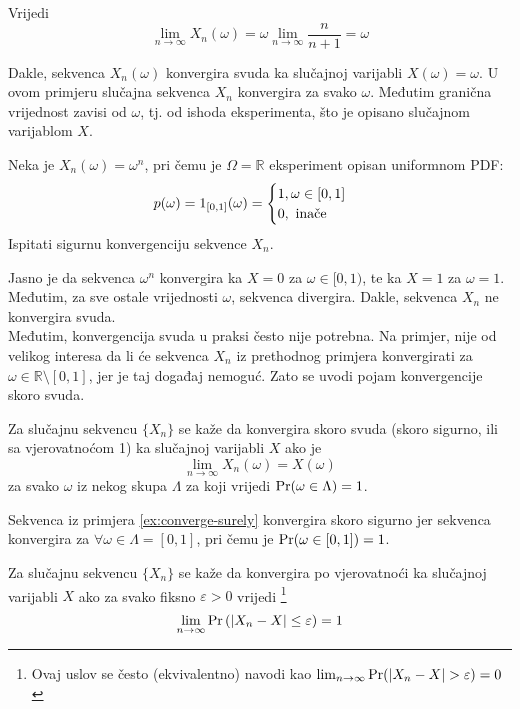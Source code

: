 Vrijedi
\begin{equation}
  \lim_{n\to\infty} X_n(\omega) = \omega \lim_{n\to\infty}\frac{n}{n+1} = \omega
\end{equation}

Dakle, sekvenca $X_n(\omega)$ konvergira svuda ka slučajnoj varijabli $X(\omega)
= \omega$. U ovom primjeru slučajna sekvenca $X_n$ konvergira za svako $\omega$.
Međutim granična vrijednost zavisi od $\omega$, tj. od ishoda eksperimenta, što
je opisano slučajnom varijablom $X$.

\begin{exmp} \label{ex:converge-surely}
  Neka je $X_n(\omega) = \omega^n$, pri čemu je $\Omega= \mathbb{R}$ eksperiment
  opisan uniformnom PDF:
  $$p(\omega) = 1_{[0,1]}(\omega) = \begin{cases}
      1, \omega \in [0,1]\ \\ 0,\ \text{\normalfont inače}
    \end{cases}
  $$
  Ispitati sigurnu konvergenciju sekvence $X_n$.
\end{exmp}

Jasno je da sekvenca $\omega^n$ konvergira ka $X=0$ za $\omega \in [0,1)$, te ka
$X=1$ za $\omega = 1$. Međutim, za sve ostale vrijednosti $\omega$, sekvenca
divergira. Dakle, sekvenca $X_n$ ne konvergira svuda.\\

Međutim, konvergencija svuda u praksi često nije potrebna. Na primjer, nije od
velikog interesa da li će sekvenca $X_n$ iz prethodnog primjera konvergirati za
$\omega \in \mathbb{R}\setminus[0,1]$, jer je taj događaj nemoguć. Zato se uvodi
pojam konvergencije skoro svuda.

\begin{definition}
  Za slučajnu sekvencu $\{X_n\}$ se kaže da konvergira skoro svuda (skoro
  sigurno, ili sa vjerovatnoćom 1) ka slučajnoj varijabli $X$ ako je
  \begin{equation}
    \lim_{n\to\infty} X_n(\omega) = X(\omega)
  \end{equation}
  za svako $\omega$ iz nekog skupa $\Lambda$ za koji vrijedi
  $\mathrm{Pr}(\omega\in\Lambda)=1$.
\end{definition}

Sekvenca iz primjera \ref{ex:converge-surely} konvergira skoro sigurno jer
sekvenca konvergira za $\forall \omega \in \Lambda = [0,1]$, pri čemu je
$\mathrm{Pr}(\omega \in [0,1]) = 1$.

\begin{definition}
  Za slučajnu sekvencu $\{X_n\}$ se kaže da konvergira po vjerovatnoći ka
  slučajnoj varijabli $X$ ako za svako fiksno $\varepsilon > 0$ vrijedi
  \footnote{
    Ovaj uslov se često (ekvivalentno) navodi kao
    $\lim_{n\to\infty} \pr(|X_n-X|>\varepsilon) = 0$
  }
  \begin{equation}
    \lim_{n\to\infty} \mathrm{Pr}\left(|X_n - X| \le \varepsilon\right) = 1
  \end{equation}
\end{definition}

